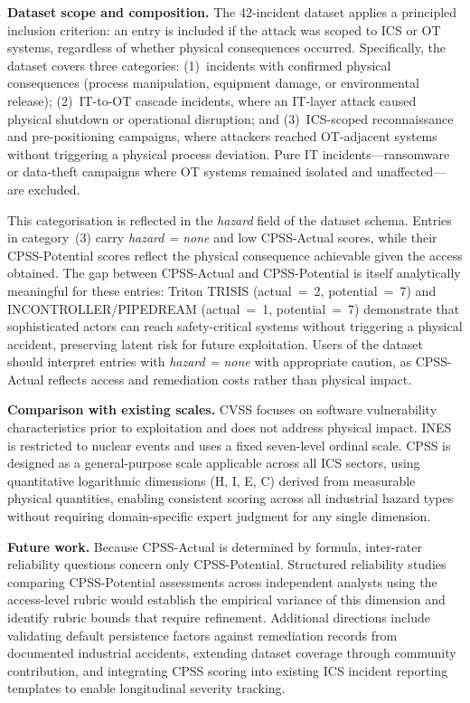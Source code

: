 \documentclass[11pt]{article}
\begin{document}
\textbf{Dataset scope and composition.}
The 42-incident dataset applies a principled inclusion criterion:
an entry is included if the attack was scoped to ICS or OT systems,
regardless of whether physical consequences occurred.
Specifically, the dataset covers three categories:
(1)~incidents with confirmed physical consequences
(process manipulation, equipment damage, or environmental release);
(2)~IT-to-OT cascade incidents, where an IT-layer attack caused
physical shutdown or operational disruption;
and (3)~ICS-scoped reconnaissance and pre-positioning campaigns,
where attackers reached OT-adjacent systems without triggering
a physical process deviation.
Pure IT incidents---ransomware or data-theft campaigns where OT systems
remained isolated and unaffected---are excluded.

This categorisation is reflected in the \textit{hazard} field of the
dataset schema. Entries in category~(3) carry \textit{hazard = none}
and low CPSS-Actual scores, while their CPSS-Potential scores reflect
the physical consequence achievable given the access obtained.
The gap between CPSS-Actual and CPSS-Potential is itself analytically
meaningful for these entries: Triton TRISIS (actual~=~2,
potential~=~7) and INCONTROLLER/PIPEDREAM (actual~=~1, potential~=~7)
demonstrate that sophisticated actors can reach safety-critical systems
without triggering a physical accident, preserving latent risk
for future exploitation.
Users of the dataset should interpret entries with
\textit{hazard = none} with appropriate caution, as CPSS-Actual
reflects access and remediation costs rather than physical impact.

\textbf{Comparison with existing scales.}
CVSS focuses on software vulnerability characteristics prior to
exploitation and does not address physical impact.
INES is restricted to nuclear events and uses a fixed seven-level
ordinal scale. CPSS is designed as a general-purpose scale applicable
across all ICS sectors, using quantitative logarithmic dimensions
(H, I, E, C) derived from measurable physical quantities, enabling
consistent scoring across all industrial hazard types without
requiring domain-specific expert judgment for any single dimension.

\textbf{Future work.}
Because CPSS-Actual is determined by formula, inter-rater reliability
questions concern only CPSS-Potential.
Structured reliability studies comparing CPSS-Potential assessments across
independent analysts using the access-level rubric would establish the
empirical variance of this dimension and identify rubric bounds that require
refinement.
Additional directions include validating default persistence factors
against remediation records from documented industrial accidents,
extending dataset coverage through community contribution,
and integrating CPSS scoring into existing ICS incident reporting
templates to enable longitudinal severity tracking.
\end{document}
